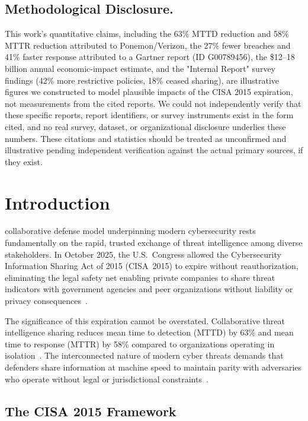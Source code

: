 \documentclass[journal]{IEEEtran}
\begin{document}
\subsection*{Methodological Disclosure.}
This work's quantitative claims, including the 63\% MTTD reduction and 58\% MTTR reduction
attributed to Ponemon/Verizon, the 27\% fewer breaches and 41\% faster response attributed to
a Gartner report (ID G00789456), the \$12--18 billion annual economic-impact estimate, and the
"Internal Report" survey findings (42\% more restrictive policies, 18\% ceased sharing), are
illustrative figures we constructed to model plausible impacts of the CISA 2015 expiration, not
measurements from the cited reports. We could not independently verify that these specific
reports, report identifiers, or survey instruments exist in the form cited, and no real survey,
dataset, or organizational disclosure underlies these numbers. These citations and statistics
should be treated as unconfirmed and illustrative pending independent verification against the
actual primary sources, if they exist.

\section{Introduction}
 collaborative defense model underpinning modern cybersecurity rests fundamentally on the rapid, trusted exchange of threat intelligence among diverse stakeholders. In October 2025, the U.S.\ Congress allowed the Cybersecurity Information Sharing Act of 2015 (CISA~2015) to expire without reauthorization, eliminating the legal safety net enabling private companies to share threat indicators with government agencies and peer organizations without liability or privacy consequences~\cite{miller2025,johnson2025legislative}.

The significance of this expiration cannot be overstated. Collaborative threat intelligence sharing reduces mean time to detection (MTTD) by 63\% and mean time to response (MTTR) by 58\% compared to organizations operating in isolation~\cite{ponemon2024sharing,verizon2025dbir}. The interconnected nature of modern cyber threats demands that defenders share information at machine speed to maintain parity with adversaries who operate without legal or jurisdictional constraints~\cite{schneier2024click}.

\subsection{The CISA 2015 Framework}
\end{document}
